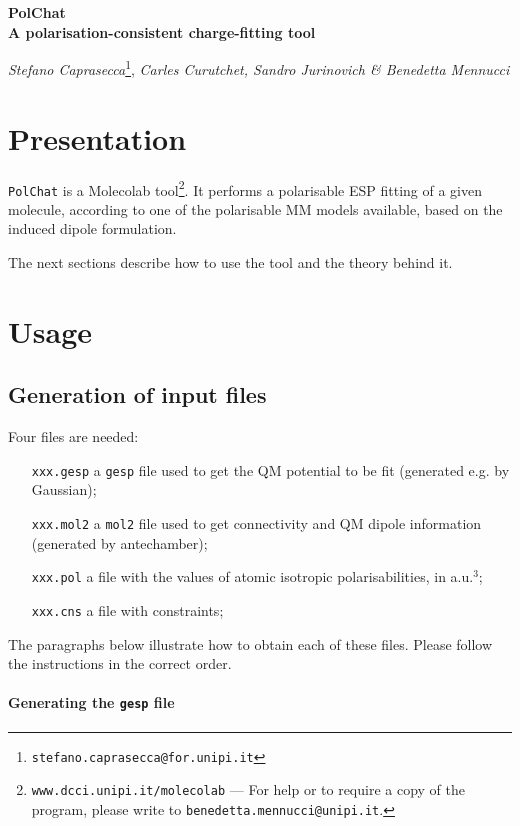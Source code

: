 \documentclass[a4paper]{report}
\begin{document}
\Large
\begin{center}
\textbf{PolChat \\ A polarisation-consistent charge-fitting tool}
\end{center}
\normalsize
\begin{center}
\emph{Stefano Caprasecca}\footnote{\texttt{stefano.caprasecca@for.unipi.it}},
\emph{Carles Curutchet, Sandro Jurinovich \& Benedetta Mennucci}
\end{center}

\section*{Presentation}

\texttt{PolChat} is a Molecolab tool\footnote{\texttt{www.dcci.unipi.it/molecolab} ---
For help or to require a copy of the program, please write to
\texttt{benedetta.mennucci@unipi.it}.}. It performs a
polarisable ESP fitting of a given molecule, according to one of the polarisable MM models available, based on the induced dipole formulation.

The next sections describe how to use the tool and the theory behind it.

\section*{Usage}

\subsection*{Generation of input files}

Four files are needed:
\begin{itemize}
\item[\texttt{xxx.gesp}] a \texttt{gesp} file used to get the QM potential to be fit
(generated e.g. by Gaussian);
\item[\texttt{xxx.mol2}] a \texttt{mol2} file used to get connectivity and QM dipole
information (generated by antechamber);
\item[\texttt{xxx.pol}] a file with the values of atomic isotropic polarisabilities,
in a.u.$^3$;
\item[\texttt{xxx.cns}] a file with constraints;
\end{itemize}

The paragraphs below illustrate how to obtain each of these files. Please follow the instructions in
the correct order.

\paragraph*{Generating the \texttt{gesp} file}
\end{document}
